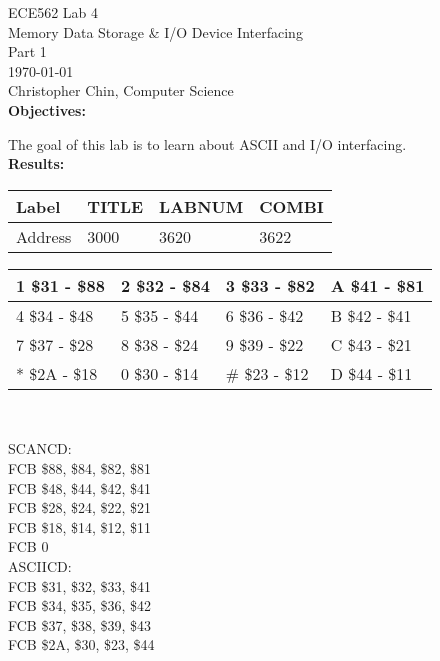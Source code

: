 \documentclass[11pt,a4paper]{article}
\begin{document}
{\parindent0pt
ECE562 Lab 4\\
Memory Data Storage \& I/O Device Interfacing\\
Part 1\\
\today\\
Christopher Chin, Computer Science\\

\textbf{Objectives:}

The goal of this lab is to learn about ASCII and I/O interfacing.\\

\textbf{Results:}

\begin{tabular}{| l | l | l | l |}
    \hline Label & TITLE & LABNUM & COMBI \\
    \hline Address & 3000 & 3620 & 3622 \\
    \hline
\end{tabular}
\vspace{5mm}

\begin{tabular}{| l | l | l | l |}
    \hline 1 \$31 - \$88 & 2 \$32 - \$84 & 3 \$33 - \$82 & A \$41 - \$81 \\
    \hline 4 \$34 - \$48 & 5 \$35 - \$44 & 6 \$36 - \$42 & B \$42 - \$41 \\
    \hline 7 \$37 - \$28 & 8 \$38 - \$24 & 9 \$39 - \$22 & C \$43 - \$21 \\
    \hline * \$2A - \$18 & 0 \$30 - \$14 & \# \$23 - \$12 & D \$44 - \$11 \\
    \hline
\end{tabular}\\
\vspace{1cm}

SCANCD:\\
 FCB \$88, \$84, \$82, \$81\\
 FCB \$48, \$44, \$42, \$41\\
 FCB \$28, \$24, \$22, \$21\\
 FCB \$18, \$14, \$12, \$11\\
 FCB 0\\

ASCIICD:\\
 FCB \$31, \$32, \$33, \$41\\
 FCB \$34, \$35, \$36, \$42\\
 FCB \$37, \$38, \$39, \$43\\
 FCB \$2A, \$30, \$23, \$44\\
}
\end{document}
